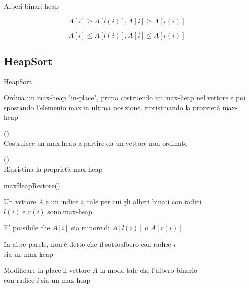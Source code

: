 \begin{frame}{Alberi binari heap}

\vspace{-9pt}
\begin{myboxtitle}
\[
A[i] \geq A[l(i)], A[i] \geq A[r(i)]
\]
\end{myboxtitle}

\begin{myboxtitle}
\[
A[i] \leq A[l(i)], A[i] \leq A[r(i)]
\]
\end{myboxtitle}


\end{frame}

\subsection{HeapSort}

\begin{frame}{HeapSort}




\begin{myboxtitle}
Ordina un max-heap "in-place", prima costruendo un max-heap nel vettore e poi spostando l'elemento max in ultima posizione, ripristinando la proprietà max-heap
\BIL
\item \alert{\heapbuild()}\\ Costruisce un max-heap a partire da un vettore non ordinato 
\item \alert{\maxheapify()}\\ Ripristina la proprietà max-heap
\EIL
\end{myboxtitle}


\end{frame}

\begin{frame}{maxHeapRestore()}

\vspace{-9pt}
\begin{myboxtitle}[Input]
Un vettore $A$ e un indice $i$, tale per cui gli alberi binari
con radici\\ $l(i)$ e $r(i)$ sono max-heap
\end{myboxtitle}

\begin{myboxtitle}[Osservazione]
\BI
\item E' possibile che $A[i]$ sia minore di $A[l(i)]$ o $A[r(i)]$
\item In altre parole, non è detto che il sottoalbero con radice $i$\\ sia
un max-heap
\EI
\end{myboxtitle}

\begin{myboxtitle}[Goal]
Modificare in-place il vettore $A$ in modo tale che l'albero binario\\ con radice $i$
sia un max-heap
\end{myboxtitle}    
    
\end{frame}

